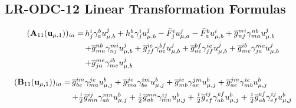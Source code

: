 \begin{subappendices}
\section{LR-ODC-12 Linear Transformation Formulas}
\label{sec:linear-transformation-formulas}

\begin{equation}
    \begin{array}{r@{\,}l}
        (\mathbf{A}_{11}(\mathbf{u}_{\mu,1}))_{ia}
        =
        &
        h_j^i
        \gamma_a^b
        u_{\mu,b}^j
        +
        h_a^b
        \gamma_j^i
        u_{\mu,b}^j
        -
        \bar{F}_j^i
        u_{\mu,a}^j
        -
        \bar{F}_a^b
        u_{\mu,b}^i
        +
        \overline{g}_{nj}^{mi}
        \gamma_{ma}^{nb}
        u_{\mu,b}^j
        \\[5pt]
        &
        +
        \overline{g}_{ma}^{nb}
        \gamma_{nj}^{mi}
        u_{\mu,b}^j
        +
        \overline{g}_{jf}^{ie}
        \gamma_{ae}^{bf}
        u_{\mu,b}^j
        +
        \overline{g}_{ae}^{bf}
        \gamma_{jf}^{ie}
        u_{\mu,b}^j
        +
        \overline{g}_{me}^{ib}
        \gamma_{ja}^{me}
        u_{\mu,b}^j
        \\[5pt]
        &
        +
        \overline{g}_{ja}^{me}
        \gamma_{me}^{ib}
        u_{\mu,b}^j
    \end{array}
\end{equation}

\begin{equation}
    \begin{array}{r@{\,}l}
        (\mathbf{B}_{11}(\mathbf{u}_{\mu,1}))_{ia}
        =
        &
        \overline{g}_{be}^{im}
        \gamma_{ma}^{je}
        u_{\mu,j}^b
        +
        \overline{g}_{ma}^{je}
        \gamma_{be}^{im}
        u_{\mu,j}^b
        +
        \overline{g}_{mb}^{ie}
        \gamma_{ae}^{jm}
        u_{\mu,j}^b
        +
        \overline{g}_{ae}^{jm}
        \gamma_{mb}^{ie}
        u_{\mu,j}^b
        \\[5pt]
        &
        +
        \tfrac{1}{2}
        \overline{g}_{mn}^{ij}
        \gamma_{ab}^{mn}
        u_{\mu,j}^b
        +
        \tfrac{1}{2}
        \overline{g}_{ab}^{mn}
        \gamma_{mn}^{ij}
        u_{\mu,j}^b
        +
        \tfrac{1}{2}
        \overline{g}_{ef}^{ij}
        \gamma_{ab}^{ef}
        u_{\mu,j}^b
        +
        \tfrac{1}{2}
        \overline{g}_{ab}^{ef}
        \gamma_{ef}^{ij}
        u_{\mu,j}^b
    \end{array}
\end{equation}


\end{subappendices}
